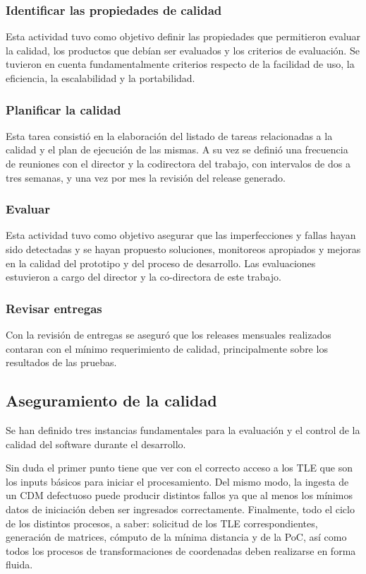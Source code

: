 \subsubsection*{Identificar las propiedades de calidad}
Esta actividad tuvo como objetivo definir las propiedades que permitieron evaluar la calidad, los productos que debían ser evaluados y los criterios de evaluación. Se tuvieron en cuenta fundamentalmente criterios respecto de la facilidad de uso, la eficiencia, la escalabilidad y la portabilidad. 

\subsubsection*{Planificar la calidad}
Esta tarea consisti\'o en la elaboraci\'on del listado de tareas relacionadas a la calidad y el plan de ejecuci\'on de las mismas. A su vez se defini\'o una frecuencia de reuniones con el director y la codirectora del trabajo, con intervalos de dos a tres semanas, y una vez por mes la revisi\'on del release generado. 

\subsubsection*{Evaluar}
Esta actividad tuvo como objetivo asegurar que las imperfecciones y fallas hayan sido detectadas y se hayan propuesto soluciones, monitoreos apropiados y mejoras en la calidad del prototipo y del proceso de desarrollo. Las evaluaciones estuvieron a cargo del director y la co-directora de este trabajo. 

\subsubsection*{Revisar entregas}
Con la revisi\'on de entregas se asegur\'o que los releases mensuales realizados contaran con el m\'inimo requerimiento de calidad, principalmente sobre los resultados de las pruebas.

\subsection*{Aseguramiento de la calidad}
Se han definido tres instancias fundamentales para la evaluaci\'on y el control de la calidad del software durante el desarrollo.

Sin duda el primer punto tiene que ver con el correcto acceso a los TLE que son los inputs b\'asicos para iniciar el procesamiento. Del mismo modo, la ingesta de un CDM defectuoso puede producir distintos fallos ya que al menos los m\'inimos datos de iniciaci\'on deben ser ingresados correctamente. Finalmente, todo el ciclo de los distintos procesos, a saber: solicitud de los TLE correspondientes, generaci\'on de matrices, c\'omputo de la m\'inima distancia y de la PoC, as\'i como todos los procesos de transformaciones de coordenadas deben realizarse en forma fluida.

